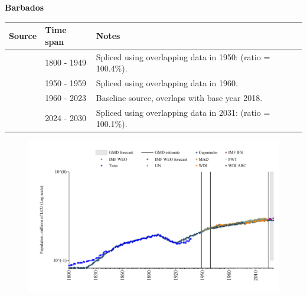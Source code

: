 \documentclass[12pt,a4paper,landscape]{article}
\begin{document}
\begin{adjustbox}{max totalsize={\paperwidth}{\paperheight},center}
\begin{minipage}[t][\textheight][t]{\textwidth}
\vspace*{0.5cm}
{}
\begin{center}
{\Large\bfseries Barbados}
\end{center}
\vspace{0.5cm}
\begin{table}[H]
\centering
\small
\begin{tabular}{|l|l|l|}
\hline
\textbf{Source} & \textbf{Time span} & \textbf{Notes} \\
\hline
\rowcolor{white}\cite{Gapminder}& 1800 - 1949 &Spliced using overlapping data in 1950: (ratio = 100.4\%).\\
\rowcolor{lightgray}\cite{IMF_IFS}& 1950 - 1959 &Spliced using overlapping data in 1960.\\
\rowcolor{white}\cite{WDI}& 1960 - 2023 &Baseline source, overlaps with base year 2018.\\
\rowcolor{lightgray}\cite{Gapminder}& 2024 - 2030 &Spliced using overlapping data in 2031: (ratio = 100.1\%).\\
\hline
\end{tabular}
\end{table}
\begin{figure}[H]
\centering
\includegraphics[width=\textwidth,height=0.6\textheight,keepaspectratio]{graphs/BRB_pop.pdf}
\end{figure}
\end{minipage}
\end{adjustbox}
\end{document}
